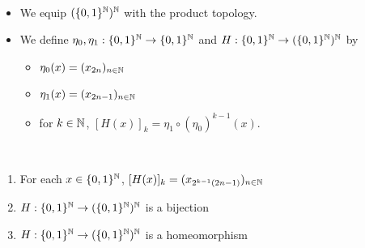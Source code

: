 \documentclass{book}
\begin{document}
	\begin{defn}\
		\begin{itemize}
			\item We equip $(\{0,1\}^{\mathbb{N}})^{\mathbb{N}}$ with the product topology.
			\item We define $\eta_0, \eta_1: \{0,1\}^{\mathbb{N}} \rightarrow \{0,1\}^{\mathbb{N}}$ and $H: \{0,1\}^{\mathbb{N}} \rightarrow (\{0,1\}^{\mathbb{N}})^{\mathbb{N}}$ by
			\begin{itemize}
				\item  $\eta_0(x) = (x_{2n})_{n \in \mathbb{N}}$
				\item $\eta_1(x) = (x_{2n-1})_{n \in \mathbb{N}}$ 
				\item for $k \in \mathbb{N}$, $[H(x)]_k = \eta_1 \circ (\eta_0)^{k-1}(x)$. 
			\end{itemize}
		\end{itemize}
	\end{defn}
	
	\begin{ex}\
		\begin{enumerate}
			\item For each $x \in \{0,1\}^{\mathbb{N}}$, $[H(x)]_k = (x_{2^{k-1}(2n-1)})_{n \in \mathbb{N}}$
			\item $H: \{0,1\}^{\mathbb{N}} \rightarrow (\{0,1\}^{\mathbb{N}})^{\mathbb{N}}$ is a bijection
			\item $H: \{0,1\}^{\mathbb{N}} \rightarrow (\{0,1\}^{\mathbb{N}})^{\mathbb{N}}$ is a homeomorphism
		\end{enumerate}
	\end{ex}
	
\end{document}

